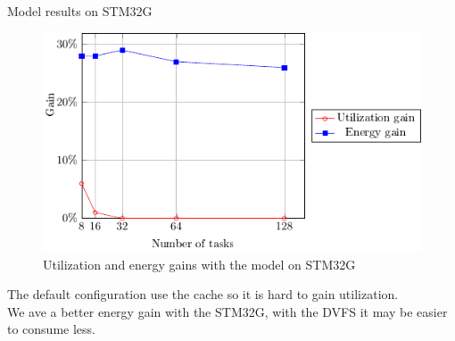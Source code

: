 \documentclass[
	11pt, %
]{beamer}
\begin{document}
\begin{frame}{Model results on STM32G}
	\begin{figure}
		\includegraphics{data/model/results_32g.pdf}
		\caption{Utilization and energy gains with the model on STM32G}
	\end{figure}
	The default configuration use the cache so it is hard to gain utilization.\\
	We ave a better energy gain with the STM32G, with the DVFS it may be easier to consume less.
\end{frame}
\end{document}
